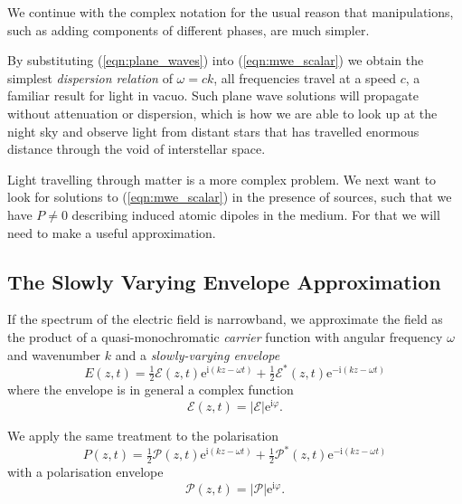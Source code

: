     We continue with the complex notation for the usual reason that
    manipulations, such as adding components of different phases, are much
    simpler.

    By substituting (\ref{eqn:plane_waves}) into (\ref{eqn:mwe_scalar}) we
    obtain the simplest \textit{dispersion relation} of $\omega = c k$, \ie all
    frequencies travel at a speed $c$, a familiar result for light in vacuo.
    Such plane wave solutions will propagate without attenuation or dispersion,
    which is how we are able to look up at the night sky and observe light from
    distant stars that has travelled enormous distance through the void of
    interstellar space.

    Light travelling through matter is a more complex problem. We next want to
    look for solutions to (\ref{eqn:mwe_scalar}) in the presence of sources,
    such that we have $P \ne 0$ describing induced atomic dipoles in the medium.
    For that we will need to make a useful approximation.

  \subsection{The Slowly Varying Envelope Approximation}

    If the spectrum of the electric field is narrowband, we approximate the
    field as the product of a quasi-monochromatic \textit{carrier} function with
    angular frequency $\omega$ and wavenumber $k$ and a \textit{slowly-varying
    envelope}
    \begin{equation}
      E(z,t) = \tfrac{1}{2} \mathcal{E}(z,t) 
                    \mathrm{e}^{\mathrm{i}(k z - \omega t)} 
                + \tfrac{1}{2} \mathcal{E}^*(z,t) 
                    \mathrm{e}^{-\mathrm{i}(k z - \omega t)}
    \label{eqn:envelope_carrier_ansatz}
    \end{equation}
    where the envelope is in general a complex function 
    \begin{equation}
      \mathcal{E}(z,t) = \lvert \mathcal{E} \rvert 
                            \mathrm{e}^{\mathrm{i} \varphi}.
    \end{equation}
    
    We apply the same treatment to the polarisation
    \begin{equation}
      P(z,t) = \tfrac{1}{2} \mathcal{P}(z,t) 
                    \mathrm{e}^{\mathrm{i}(k z - \omega t)} 
                + \tfrac{1}{2} \mathcal{P}^*(z,t) 
                    \mathrm{e}^{-\mathrm{i}(k z - \omega t)}
    \end{equation}
    with a polarisation envelope
    \begin{equation}
      \mathcal{P}(z,t) = \lvert \mathcal{P} \rvert 
                            \mathrm{e}^{\mathrm{i} \varphi}.
    \end{equation}

